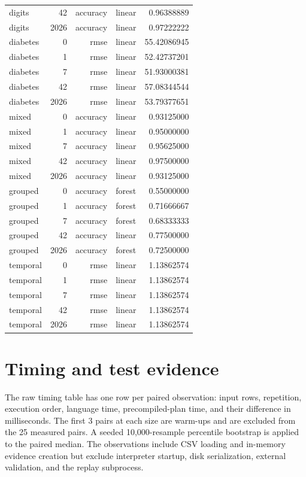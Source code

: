 \documentclass[11pt,letterpaper]{article}
\begin{document}
\begin{longtable}{lrrlr}
digits & 42 & accuracy & linear & 0.96388889\\
digits & 2026 & accuracy & linear & 0.97222222\\
diabetes & 0 & rmse & linear & 55.42086945\\
diabetes & 1 & rmse & linear & 52.42737201\\
diabetes & 7 & rmse & linear & 51.93000381\\
diabetes & 42 & rmse & linear & 57.08344544\\
diabetes & 2026 & rmse & linear & 53.79377651\\
mixed & 0 & accuracy & linear & 0.93125000\\
mixed & 1 & accuracy & linear & 0.95000000\\
mixed & 7 & accuracy & linear & 0.95625000\\
mixed & 42 & accuracy & linear & 0.97500000\\
mixed & 2026 & accuracy & linear & 0.93125000\\
grouped & 0 & accuracy & forest & 0.55000000\\
grouped & 1 & accuracy & forest & 0.71666667\\
grouped & 7 & accuracy & forest & 0.68333333\\
grouped & 42 & accuracy & linear & 0.77500000\\
grouped & 2026 & accuracy & forest & 0.72500000\\
temporal & 0 & rmse & linear & 1.13862574\\
temporal & 1 & rmse & linear & 1.13862574\\
temporal & 7 & rmse & linear & 1.13862574\\
temporal & 42 & rmse & linear & 1.13862574\\
temporal & 2026 & rmse & linear & 1.13862574\\
\bottomrule\end{longtable}

\section{Timing and test evidence}
The raw timing table has one row per paired observation: input rows, repetition, execution order, language time, precompiled-plan time, and their difference in milliseconds. The first 3 pairs at each size are warm-ups and are excluded from the 25 measured pairs. A seeded 10,000-resample percentile bootstrap is applied to the paired median. The observations include CSV loading and in-memory evidence creation but exclude interpreter startup, disk serialization, external validation, and the replay subprocess.
\end{document}
